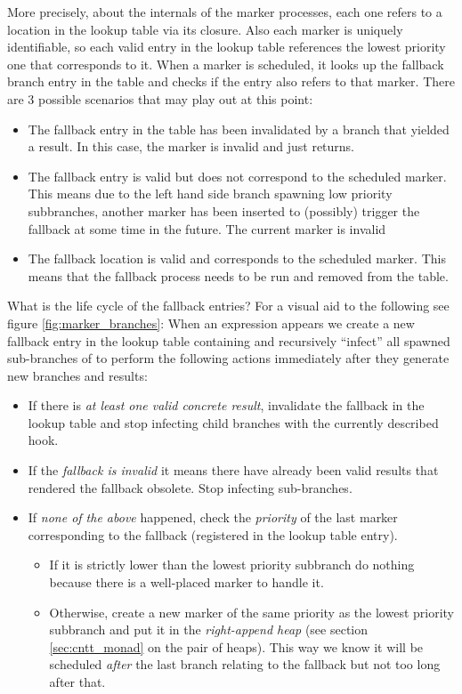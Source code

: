 More precisely, about the internals of the marker processes, each one
refers to a location in the lookup table via its closure. Also each
marker is uniquely identifiable, so each valid entry in the lookup
table references the lowest priority one that corresponds
to it. When a marker is scheduled, it looks up the fallback branch
entry in the table and checks if the entry also refers to that
marker. There are 3 possible scenarios that may play out at this point:

\begin{itemize}
\item The fallback entry in the table has been invalidated by a branch
  that yielded a result. In this case, the marker is invalid and just
  returns.
\item The fallback entry is valid but does not correspond to the
  scheduled marker. This means due to the left hand side branch
  spawning low priority subbranches, another marker has been inserted
  to (possibly) trigger the fallback at some time in the future. The
  current marker is invalid
\item The fallback location is valid and corresponds to the scheduled
  marker. This means that the fallback process needs to be run
  and removed from the table.
\end{itemize}

What is the life cycle of the fallback entries? For a visual aid to the
following see figure \ref{fig:marker_branches}: When an expression
 appears we create a new fallback entry in the lookup
table containing  and recursively ``infect'' all spawned
sub-branches of  to perform the following actions immediately
after they generate new branches and results:

\begin{itemize}
\item If there is \emph{at least one valid concrete result}, invalidate the
  fallback in the lookup table and stop infecting child branches with
  the currently described hook.
\item If the \emph{fallback is invalid} it means there have already been
  valid results that rendered the fallback obsolete. Stop infecting
  sub-branches.
\item If \emph{none of the above} happened, check the \emph{priority} of the
  last marker corresponding to the fallback (registered in the lookup
  table entry).

  \begin{itemize}
  \item If it is strictly lower than the lowest priority
    subbranch do nothing because there is a well-placed marker to handle
    it.
  \item Otherwise, create a new marker of the same priority as the
    lowest priority subbranch and put it in the \emph{right-append
    heap} (see section \ref{sec:cntt_monad} on the pair of
    heaps). This way we know it will be scheduled \emph{after} the
    last branch relating to the fallback but not too long after that.
  \end{itemize}


\end{itemize}

